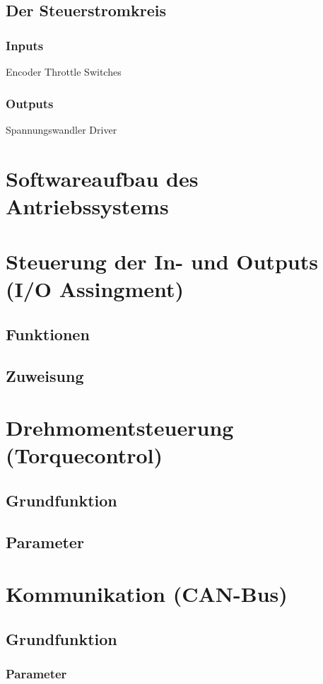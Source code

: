 \subsection{Der Steuerstromkreis}
\subsubsection{Inputs}
Encoder
Throttle
Switches
\subsubsection{Outputs}
Spannungswandler
Driver



\section{Softwareaufbau des Antriebssystems}

\section{ Steuerung der In- und Outputs (I/O Assingment)}
\subsection{Funktionen}
\subsection{Zuweisung}


\section{Drehmomentsteuerung (Torquecontrol)}
\subsection{Grundfunktion}
\subsection{Parameter}

\section{Kommunikation (CAN-Bus)}
\subsection{Grundfunktion}
\subsubsection{Parameter}
